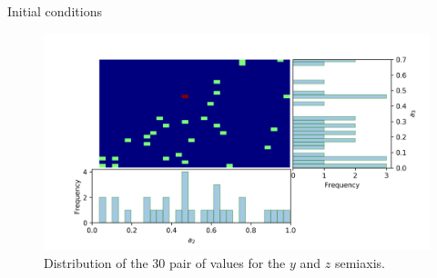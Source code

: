 \documentclass{beamer}
\begin{document}
\begin{frame}{Initial conditions}
	\begin{figure}[h]
		\centering
		\includegraphics[width = 0.9\linewidth]{"../Files/Week 13/triaxial_axes"}
		\caption{Distribution of the 30 pair of values for the $y$ and $z$ semiaxis.}
		\label{fig: semiaxisDist}
	\end{figure}
\end{frame}
\end{document}
